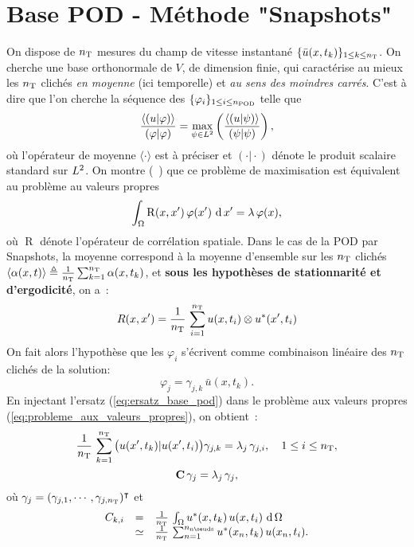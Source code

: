 \documentclass[11pt,a4paper]{article}
\newcommand{\nnodes}{{n_{\labelname{nœuds}}}}
\newcommand{\nt}{{n_{\labelname t}}}
\newcommand{\npod}{{n_{\labelname{POD}}}}
\renewcommand{\nt}{{n_{\labelname T}}}
\begin{document}
\section{Base POD - Méthode "Snapshots"}
%
On dispose de $\nt$ mesures du champ de vitesse instantané $\{\bar u(x,t_k)\}_{1\leq k \leq \nt}$. On cherche une base orthonormale de $V$, de dimension finie, qui caractérise au mieux les $\nt$ clichés \textit{en moyenne} (ici temporelle) et \textit{au sens des moindres carrés}. C'est à dire que l'on cherche la séquence des $\{\varphi_i\}_{1\leq i \leq \npod}$ telle que 
$$\frac{\langle \left( u \vert \varphi \right) \rangle}{ \left( \varphi \vert \varphi \right)} = \underset{\psi \in L ^2}{\operatorname{max}}\left( \frac{\langle \left( u \vert \psi \right) \rangle}{ \left( \psi \vert \psi \right)} \right),$$
où l'opérateur de moyenne $\langle \cdot \rangle$ est à préciser et $(\cdot\vert \cdot)$ dénote le produit scalaire standard sur $L^2$.
%
On montre (\cf~\cite[sec. 4.1 et eq. (36)]{cordier2003proper}) que ce problème de maximisation est équivalent au problème au valeurs propres
\begin{equation}
\label{eq:probleme_aux_valeurs_propres}
\int_\Omega\operatorname R(x, x^\prime)\,\varphi(x^\prime)\,\operatorname{d} x^\prime = \lambda\,\varphi(x),
\end{equation}
où $\operatorname R$ dénote l'opérateur de corrélation spatiale. Dans le cas de la POD par Snapshots, la moyenne correspond à la moyenne d'ensemble sur les $\nt$ clichés $\langle \alpha(x, t) \rangle \triangleq \frac{1}{\nt}\sum_{k=1}^{\nt}\alpha(x,t_k)$, et \textbf{sous les hypothèses de stationnarité et d'ergodicité}, on a~\cite[p. 32]{cordier2003proper}:
\begin{equation}
R(x, x^\prime) = \frac{1}{\nt}\,\sum_{i=1}^{\nt} u(x,t_i)\otimes u^*(x^\prime,t_i)
\end{equation}
%
On fait alors l'hypothèse que les $\varphi_i$ s'écrivent comme combinaison linéaire des $\nt$ clichés de la solution:\begin{equation}
\label{eq:ersatz_base_pod}
\varphi_j = \gamma_{j,k}\,\bar{u}(x, t_k).
\end{equation}
%
En injectant l'ersatz (\ref{eq:ersatz_base_pod}) dans le problème aux valeurs propres (\ref{eq:probleme_aux_valeurs_propres}), on obtient~\cite[eq. (37)]{cordier2003proper}:
\begin{equation}
\label{eq:probleme_aux_valeurs_propres_sur_les_gammas_ij}
\frac{1}{\nt}\,\sum_{k=1}^{\nt}\big(u(x^\prime,t_k) \vert u(x^\prime,t_i)\big)\gamma_{j,k} = \lambda_j\,\gamma_{j,i},\quad 1\leq i \leq \nt,
\end{equation}
\ie
\begin{equation}
\mathbf{C}\,\gamma_j = \lambda_j\,\gamma_j,
\end{equation}
où $\gamma_j = (\gamma_{j,1},\cdots,\gamma_{j,\nt})^\T$ et 
$$ 
\begin{array}{rcl}
C_{k,i} & = & \frac{1}{\nt}\,\int_\Omega u^*(x, t_k) \, u(x, t_i)\,\d \Omega \\
& \simeq & \frac{1}{\nt}\,\sum_{n=1}^{\nnodes} u^*(x_n, t_k) \, u(x_n, t_i).
\end{array}
$$
\end{document}
